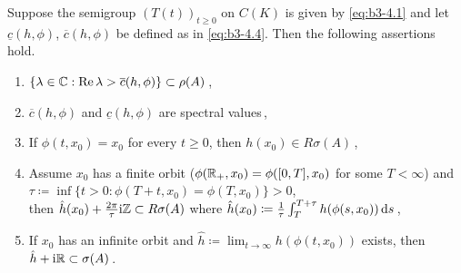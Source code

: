 \begin{proposition}\label{prop:b3-4.8}
	Suppose the semigroup $(T(t))_{t\geq 0}$ on $C(K)$ is given by \eqref{eq:b3-4.1} and let $\underline{c}(h,\phi)$, $\overline{c}(h,\phi)$ be defined as in \eqref{eq:b3-4.4}.
	Then the following assertions hold.
	\begin{enumerate}[\upshape (i)]
		\item 
		$\{\lambda \in \mathbb{C} : \mathop{}\!\mathrm{Re}\,\lambda > \overline{c}(h,\phi)\} \subset \rho(A)$\,,
		
		\item 
		$\overline{c}(h,\phi)$ and $\underline{c}(h,\phi)$ are spectral values\,,
		
		\item 
		If $\phi(t,x_{0}) = x_{0}$ for every $t \geq 0$, then $h(x_{0}) \in R{\sigma}(A)$\,,
		
		\item 
		Assume $x_{0}$ has a finite orbit (\ie $\phi(\mathbb{R}_{+},x_{0}) = \phi([0,T],x_{0})$ for some $T < \infty$) and $\tau \coloneq \inf\{t > 0 : \phi(T+t,x_{0}) = \phi(T,x_{0})\} > 0$, \\
		then $\hat{h}(x_{0}) + \frac{2\pi}{\tau}\mathrm{i}\mathbb{Z} \subset R{\sigma}(A)$ where $\hat{h}(x_{0}) \coloneq	\frac{1}{\tau}\int_{T}^{T+\tau}h(\phi(s,x_{0}))\mathop{}\!\mathrm{d}{s} $\,,
		
		\item 
		If $x_{0}$ has an infinite orbit and $\hat{h} \coloneq  \lim_{t\to\infty}h(\phi(t,x_{0}))$ exists, then $\hat{h} + \mathrm{i}\mathbb{R} \subset \sigma(A)$\,.
	\end{enumerate}
\end{proposition}
